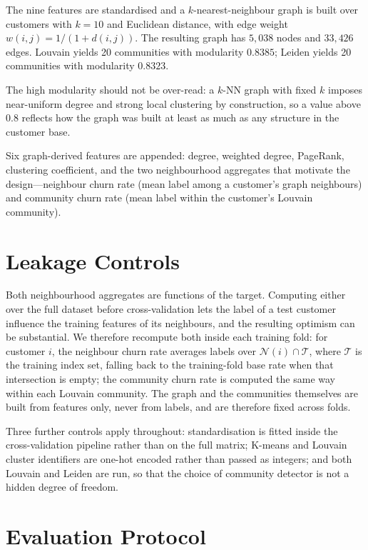 \documentclass[runningheads]{llncs}
\begin{document}
The nine features are standardised and a $k$-nearest-neighbour graph is built
over customers with $k = 10$ and Euclidean distance, with edge weight
$w(i,j) = 1/(1 + d(i,j))$. The resulting graph has $5{,}038$ nodes and $33{,}426$
edges. Louvain \cite{blondel2008louvain} yields 20 communities with modularity
$0.8385$; Leiden \cite{traag2019leiden} yields 20 communities with modularity
$0.8323$.

The high modularity should not be over-read: a $k$-NN graph with fixed $k$ imposes
near-uniform degree and strong local clustering by construction, so a value above
$0.8$ reflects how the graph was built at least as much as any structure in the
customer base.

Six graph-derived features are appended: degree, weighted degree, PageRank,
clustering coefficient, and the two neighbourhood aggregates that motivate the
design---neighbour churn rate (mean label among a customer's graph neighbours)
and community churn rate (mean label within the customer's Louvain community).

\section{Leakage Controls}

Both neighbourhood aggregates are functions of the target. Computing either over
the full dataset before cross-validation lets the label of a test customer
influence the training features of its neighbours, and the resulting optimism can
be substantial. We therefore recompute both inside each training fold: for
customer $i$, the neighbour churn rate averages labels over
$\mathcal{N}(i) \cap \mathcal{T}$, where $\mathcal{T}$ is the training index set,
falling back to the training-fold base rate when that intersection is empty; the
community churn rate is computed the same way within each Louvain community. The
graph and the communities themselves are built from features only, never from
labels, and are therefore fixed across folds.

Three further controls apply throughout: standardisation is fitted inside the
cross-validation pipeline rather than on the full matrix; K-means and Louvain
cluster identifiers are one-hot encoded rather than passed as integers; and both
Louvain and Leiden are run, so that the choice of community detector is not a
hidden degree of freedom.

\section{Evaluation Protocol}
\end{document}
